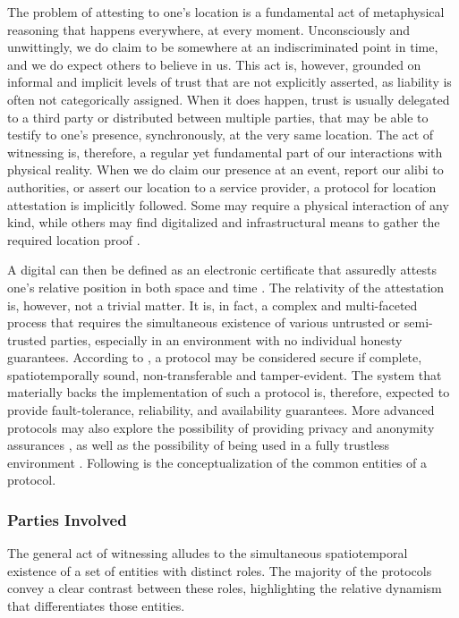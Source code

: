 The problem of attesting to one's location is a fundamental act of metaphysical reasoning that happens everywhere, at every moment. Unconsciously and unwittingly, we do claim to be somewhere at an indiscriminated point in time, and we do expect others to believe in us. This act is, however, grounded on informal and implicit levels of trust that are not explicitly asserted, as liability is often not categorically assigned. When it does happen, trust is usually delegated to a third party or distributed between multiple parties, that may be able to testify to one's presence, synchronously, at the very same location. The act of witnessing is, therefore, a regular yet fundamental part of our interactions with physical reality. When we do claim our presence at an event, report our alibi to authorities, or assert our location to a service provider, a protocol for location attestation is implicitly followed. Some may require a physical interaction of any kind, while others may find digitalized and infrastructural means to gather the required location proof \cite{luo2010veriplace}.

A digital \pol can then be defined as an electronic certificate that assuredly attests one's relative position in both space and time \cite{amoretti2018blockchain}. The relativity of the attestation is, however, not a trivial matter. It is, in fact, a complex and multi-faceted process that requires the simultaneous existence of various untrusted or semi-trusted parties, especially in an environment with no individual honesty guarantees. According to \cite{nasrulin2018robust}, a \pol protocol may be considered secure if complete, spatiotemporally sound, non-transferable and tamper-evident. The system that materially backs the implementation of such a protocol is, therefore, expected to provide fault-tolerance, reliability, and availability guarantees. More advanced protocols may also explore the possibility of providing privacy and anonymity assurances \cite{li2020privacy}, as well as the possibility of being used in a fully trustless environment \cite{amoretti2018blockchain}. Following is the conceptualization of the common entities of a \pol protocol.

\subsubsection{Parties Involved}

The general act of witnessing alludes to the simultaneous spatiotemporal existence of a set of entities with distinct roles. The majority of the protocols convey a clear contrast between these roles, highlighting the relative dynamism that differentiates those entities. 


